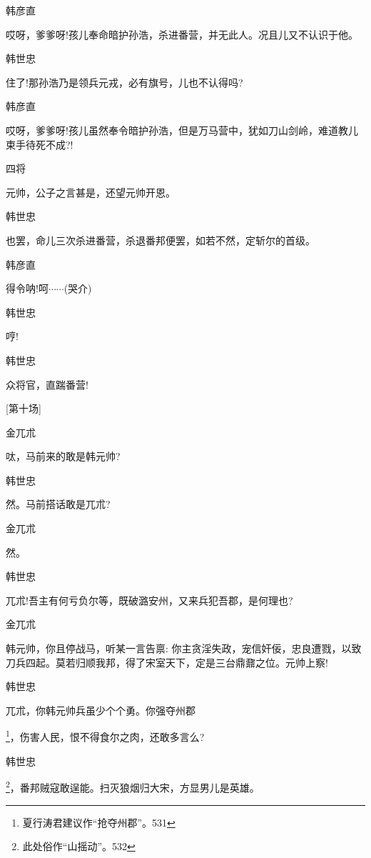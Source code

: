{{{{韩彦直

哎呀，爹爹呀!孩儿奉命暗护孙浩，杀进番营，并无此人。况且儿又不认识于他。}

{韩世忠\hspace{20pt}~

住了!那孙浩乃是领兵元戎，必有旗号，儿也不认得吗?}

{韩彦直

哎呀，爹爹呀!孩儿虽然奉令暗护孙浩，但是万马营中，犹如刀山剑岭，难道教儿束手待死不成?!}

{四将\hspace{30pt}~

元帅，公子之言甚是，还望元帅开恩。}

{韩世忠

也罢，命儿三次杀进番营，杀退番邦便罢，如若不然，定斩尔的首级。}

{韩彦直\hspace{20pt}~

得令呐!呵$\cdots{}\cdots{}$(哭介)}

{韩世忠\hspace{20pt}~

哼!}

{韩世忠\hspace{20pt}~

众将官，直踹番营!}

{{[}第十场{]}}

{金兀朮\hspace{20pt}~

呔，马前来的敢是韩元帅?}

{韩世忠\hspace{20pt}~

然。马前搭话敢是兀朮?}

{金兀朮\hspace{20pt}~

然。}

{韩世忠

兀朮!吾主有何亏负尔等，既破潞安州，又来兵犯吾郡，是何理也?}

{金兀朮

韩元帅，你且停战马，听某一言告禀: 你主贪淫失政，宠信奸佞，忠良遭戮，以致刀兵四起。莫若归顺我邦，得了宋室天下，定是三台鼎鼐之位。元帅上察!}

{韩世忠

兀朮，你韩元帅兵虽少个个勇。你强夺州郡}\footnote{ 夏行涛君建议作``抢夺州郡''。{531}}{，伤害人民，恨不得食尔之肉，还敢多言么?}

{韩世忠

\footnote{ 此处俗作``山摇动''。{532}}{，番邦贼寇敢逞能。扫灭狼烟归大宋，方显男儿是英雄。} }

}}}
